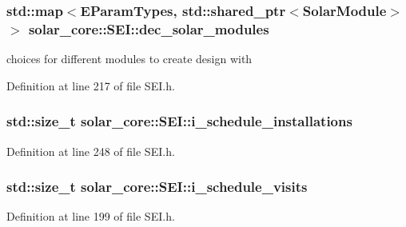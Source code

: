 \subsubsection[{dec\+\_\+solar\+\_\+modules}]{\setlength{\rightskip}{0pt plus 5cm}std\+::map$<${\bf E\+Param\+Types}, std\+::shared\+\_\+ptr$<${\bf Solar\+Module}$>$ $>$ solar\+\_\+core\+::\+S\+E\+I\+::dec\+\_\+solar\+\_\+modules\hspace{0.3cm}{\ttfamily [protected]}}\label{classsolar__core_1_1_s_e_i_a79728143af5752e09c2be29cfa1cfd8f}
choices for different modules to create design with 

Definition at line 217 of file S\+E\+I.\+h.

\hypertarget{classsolar__core_1_1_s_e_i_ad906dcd5b638e405a7daf14539096377}{}
\subsubsection[{i\+\_\+schedule\+\_\+installations}]{\setlength{\rightskip}{0pt plus 5cm}std\+::size\+\_\+t solar\+\_\+core\+::\+S\+E\+I\+::i\+\_\+schedule\+\_\+installations\hspace{0.3cm}{\ttfamily [protected]}}\label{classsolar__core_1_1_s_e_i_ad906dcd5b638e405a7daf14539096377}


Definition at line 248 of file S\+E\+I.\+h.

\hypertarget{classsolar__core_1_1_s_e_i_a3ff238346bd126ee39aa37bfee41be43}{}
\subsubsection[{i\+\_\+schedule\+\_\+visits}]{\setlength{\rightskip}{0pt plus 5cm}std\+::size\+\_\+t solar\+\_\+core\+::\+S\+E\+I\+::i\+\_\+schedule\+\_\+visits\hspace{0.3cm}{\ttfamily [protected]}}\label{classsolar__core_1_1_s_e_i_a3ff238346bd126ee39aa37bfee41be43}


Definition at line 199 of file S\+E\+I.\+h.

